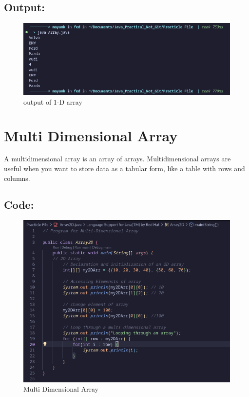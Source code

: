 \documentclass[a4paper,12pt]{article}
\begin{document}
\subsection{Output: }
\begin{figure}[H]
    \centering
    \includegraphics[width=0.9\linewidth]{images/output2.png}
    \caption{output of 1-D array}
    \label{fig:sample_image}
\end{figure}

\section{Multi Dimensional Array}
A multidimensional array is an array of arrays. Multidimensional arrays are useful when you want to store data as a tabular form, like a table with rows and columns.
\subsection{Code: }
\begin{figure}[H]
    \centering
    \includegraphics[width=0.8\linewidth]{images/array_2d.png}
    \caption{Multi Dimensional Array}
    \label{fig:sample_image}
\end{figure}
\end{document}
